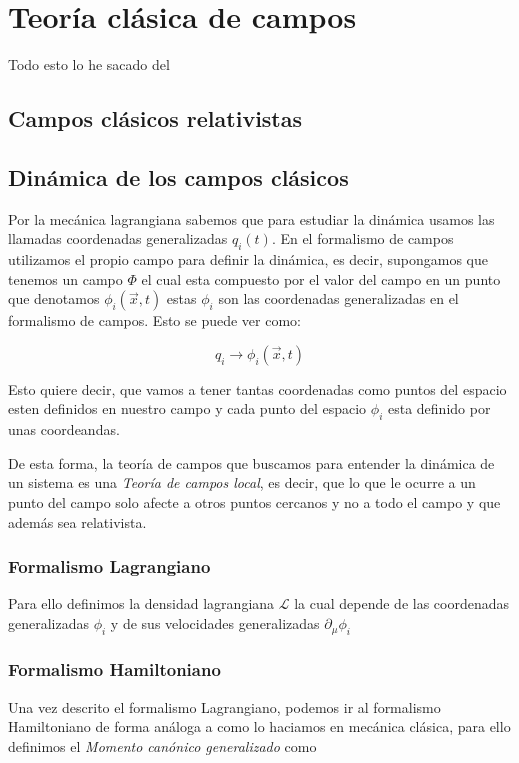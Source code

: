 \setchapterpreamble[u]{\margintoc}
\chapter{Teoría clásica de campos}

\begin{center}
  \large Todo esto lo he sacado del \cite{Dobdado}
\end{center}
\section{Campos clásicos relativistas}
\section{Dinámica de los campos clásicos}

Por la mecánica lagrangiana sabemos que para estudiar la dinámica usamos las llamadas coordenadas generalizadas $q_{i}(t)$. En el formalismo de campos utilizamos el propio campo para definir la dinámica, es decir, supongamos que tenemos un campo $\Phi$ el cual esta compuesto por el valor del campo en un punto que denotamos $\phi_{i}(\vec{x},t)$ estas $\phi_{i}$ son las coordenadas generalizadas en el formalismo de campos. Esto se puede ver como:

\[q_{i}\to\phi_{i}(\vec{x},t)\]

Esto quiere decir, que vamos a tener tantas coordenadas como puntos del espacio esten definidos en nuestro campo y cada punto del espacio $\phi_{i}$ esta definido por unas coordeandas. 

De esta forma, la teoría de campos que buscamos para entender la dinámica de un sistema es una \textit{Teoría de campos local}, es decir, que lo que le ocurre a un punto del campo solo afecte a otros puntos cercanos y no a todo el campo y que además sea relativista.
\subsection{Formalismo Lagrangiano}
Para ello definimos la densidad lagrangiana $\mathcal{L}$ la cual depende de las coordenadas generalizadas $\phi_{i}$ y de sus velocidades generalizadas $\partial_{\mu}\phi_{i}$
\subsection{Formalismo Hamiltoniano}

Una vez descrito el formalismo Lagrangiano, podemos ir al formalismo Hamiltoniano de forma análoga a como lo haciamos en mecánica clásica, para ello definimos el \textit{Momento canónico generalizado} como 

